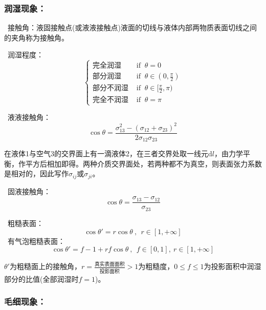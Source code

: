 \documentclass[zihao=5,UTF8]{report}
\begin{document}
\subsubsection{润湿现象：}
\par{}\ 接触角：液固接触点(或液液接触点)液面的切线与液体内部两物质表面切线之间的夹角称为接触角。    \par
{}\  润湿程度：
\begin{equation}
    \begin{cases}
        \text{完全润湿} & \text{ if }\  \theta=0 \\
        \text{部分润湿} & \text{ if }\  \theta \in (0,\frac{\pi}{2} ) \\
        \text{部分不润湿} & \text{ if }\  \theta \in [\frac{\pi }{2},\pi  )\\
        \text{完全不润湿} & \text{ if }\ \theta = \pi
    \end{cases}
\end{equation}   \par
{}\  液液接触角：
\begin{equation}
    \cos\theta = \frac{\sigma_{13}^2 - (\sigma_{12} +\sigma_{23})^2}{2\sigma_{12}\sigma_{23}}
\end{equation} 
{\par\color{gray}\small
在液体1与空气3的交界面上有一滴液体2，在三者交界处取一线元$\mathrm{d}l$，由力学平衡，作平方后相加即得。两种介质交界面处，若两种都不为真空，则表面张力系数是相对的，因此写作$\sigma_{ij}$或$\sigma_{ji}$。
\par} \par
{}\ 固液接触角：
\begin{equation}
    \cos \theta = \frac{\sigma_{13} - \sigma_{12}}{\sigma_{23}}
\end{equation}\par
{}\ 粗糙表面：
\begin{equation}
    \cos \theta' = r\cos\theta\ ,\ \ r \in [1,+\infty]
\end{equation}
\ 有气泡粗糙表面：
\begin{equation}
    \cos \theta' = f-1 + rf\cos\theta\ ,\ \ f \in [0,1],\ r \in [1,+\infty] 
\end{equation}
{\par\color{gray}\small
$\theta'$为粗糙面上的接触角，$r = \frac{\text{真实表面面积}}{\text{投影面积}} >1$为粗糙度，$0\le f\le 1$为投影面积中润湿部分的比值(全部润湿时$f=1$)。
\par}

\subsubsection{毛细现象：}
\end{document}
